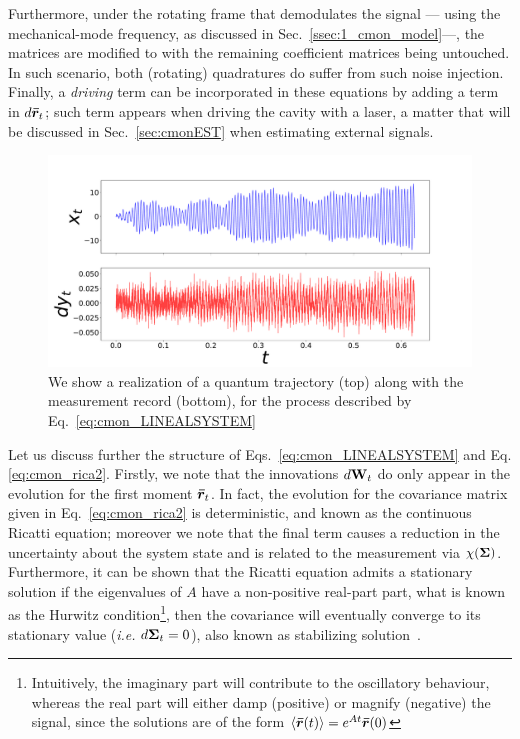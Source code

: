 Furthermore, under the rotating frame that demodulates the signal --- using the mechanical-mode frequency, as discussed in Sec.~\ref{ssec:1_cmon_model}---, the matrices are modified to
with the remaining coefficient matrices being untouched. In such scenario, both (rotating) quadratures do suffer from such noise injection. Finally, a \textit{driving} term can be incorporated in these equations by adding a term in $d\bm{\bar{r}}_t$; such term appears when driving the cavity with a laser, a matter that will be discussed in Sec.~\ref{sec:cmonEST} when estimating external signals.

\begin{figure}[t!]
    \centering
    \includegraphics[width=1.\textwidth]{Figures/CMON/estimation/evolution.pdf}
    \caption{We show a realization of a quantum trajectory (top) along with the measurement record (bottom), for the process described by Eq.~\ref{eq:cmon_LINEALSYSTEM}}
    \label{fig:evol}
\end{figure}


Let us discuss further the structure of Eqs.~\ref{eq:cmon_LINEALSYSTEM} and Eq.\ref{eq:cmon_rica2}. Firstly, we note that the innovations $d\mathbf{W}_t$ do only appear in the evolution for the first moment $\bm{\bar{r}}_t$. In fact, the evolution for the covariance matrix given in Eq.~\ref{eq:cmon_rica2} is deterministic, and known as the continuous Ricatti equation; moreover we note that the final term causes a reduction in the uncertainty about the system state and is related to the measurement via $\chi(\bm{\Sigma})$. Furthermore, it can be shown that the Ricatti equation admits a stationary solution if the eigenvalues of $A$ have a non-positive real-part part, what is known as the Hurwitz condition\footnote{Intuitively, the imaginary part will contribute to the oscillatory behaviour, whereas the real part will either damp (positive) or magnify (negative) the signal, since the solutions are of the form $\mathinner{\langle \bm{\bar{r}}(t)\rangle} = e^{At}\bm{\bar{r}}(0)$}, then the covariance will eventually converge to its stationary value
(\textit{i.e.} $d\bm{\Sigma}_t = 0$), also known as stabilizing solution~\cite{Wiseman2005optimal}.

